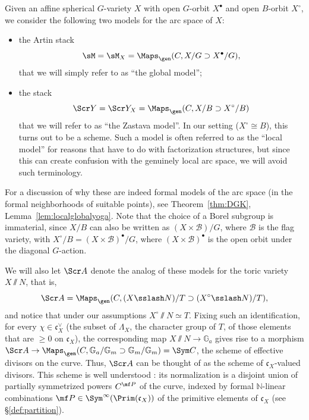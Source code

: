 \documentclass[final]{amsart}
\theoremstyle{remark}
\theoremstyle{definition}
\numberwithin{equation}{section}
\begin{document}
Given an affine spherical $G$-variety $X$ with open $G$-orbit $X^\bullet$ and open $B$-orbit $X^\circ$, we consider the following two models for the arc space of $X$:
\begin{itemize}
 \item the Artin stack 
\[ \sM= \sM_{X} = \Maps_\gen(C, X/ G \supset X^\bullet /G), \]
that we will simply refer to as ``the global model'';
 \item the stack
\[ \Scr Y=   \Scr Y_{X} = \Maps_\gen(C, X/B \supset X^\circ/B)  \]
that we will refer to as ``the Zastava model''. In our setting ($X^\circ\cong B$), this turns out to be a scheme. Such a model is often referred to as the ``local model'' for reasons that have to do with factorization structures, but since this can create confusion with the genuinely local arc space, we will avoid such terminology. 
\end{itemize}
For a discussion of why these are indeed formal models of the arc space (in the formal neighborhoods of suitable points), see Theorem~\ref{thm:DGK}, Lemma~\ref{lem:localglobalyoga}.
Note that the choice of a Borel subgroup is immaterial, since $X/B$ can also be written as $(X\times \mathcal B)/G$, where $\mathcal B$ is the flag variety, with $X^\circ/B = (X\times \mathcal B)^\bullet/G$, where $(X\times \mathcal B)^\bullet$ is the open 
orbit under the diagonal $G$-action.  

We will also let $\Scr A$ denote the analog of these models for the toric variety $X\sslash N$, that is,
\[    \Scr A = \Maps_\gen(C, (X\sslash N)/T \supset (X^\circ\sslash N)/T),  \]
and notice that under our assumptions $X^\circ\sslash N\simeq T$. Fixing such an identification, for every $\chi\in \mathfrak c_X^\vee$ 
(the subset of $\Lambda_X$, the character group of $T$, of those elements that are $\ge 0$ on $\mathfrak c_X$), the corresponding map $X\sslash N\to \mathbb G_a$ gives rise to a morphism $\Scr A \to \Maps_\gen(C, \mathbb G_a/\mathbb G_m \supset \mathbb G_m/\mathbb G_m) = \Sym C$, the scheme of effective divisors on the curve. Thus, $\Scr A$ can be thought of as the scheme of $\mathfrak c_X$-valued divisors. This scheme is well understood \cite{BNS}: its normalization is a disjoint union of partially symmetrized powers $C^{\mf P}$ of the curve, indexed by formal $\mathbb N$-linear combinations $\mf P\in \Sym^\infty(\Prim(\mathfrak c_X))$ of the primitive elements of $\mathfrak c_X$ (see \S\ref{def:partition}).

\smallskip
\end{document}

